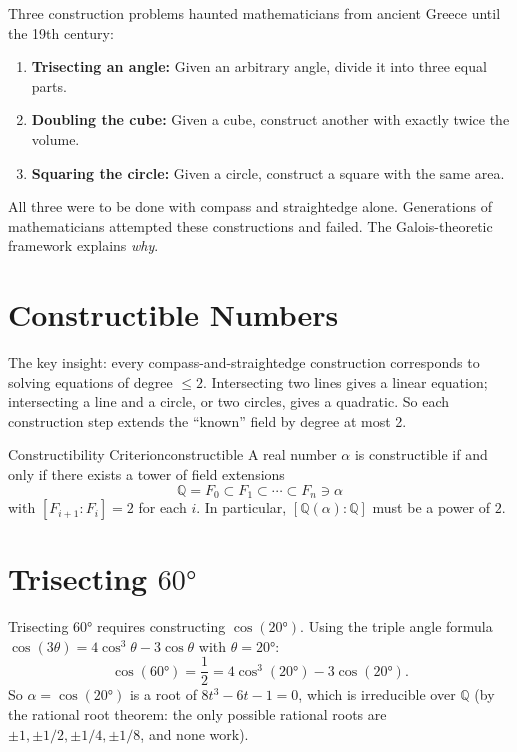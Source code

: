 \documentclass[11pt, a4paper, oneside]{book}
\newcommand{\Q}{\mathbb{Q}}
\begin{document}
\begin{historical}[title={2000 Years of Frustration}]
Three construction problems haunted mathematicians from ancient Greece until
the 19th century:
\begin{enumerate}[nosep]
\item \textbf{Trisecting an angle:} Given an arbitrary angle, divide it into
  three equal parts.
\item \textbf{Doubling the cube:} Given a cube, construct another with
  exactly twice the volume.
\item \textbf{Squaring the circle:} Given a circle, construct a square with
  the same area.
\end{enumerate}
All three were to be done with compass and straightedge alone. Generations of
mathematicians attempted these constructions and failed. The Galois-theoretic
framework explains \emph{why}.
\end{historical}

\section{Constructible Numbers}

The key insight: every compass-and-straightedge construction corresponds to
solving equations of degree $\leq 2$. Intersecting two lines gives a linear
equation; intersecting a line and a circle, or two circles, gives a quadratic.
So each construction step extends the ``known'' field by degree at most 2.

\begin{thm}{Constructibility Criterion}{constructible}
A real number $\alpha$ is constructible if and only if there exists a tower
of field extensions
\[
  \Q = F_0 \subset F_1 \subset \cdots \subset F_n \ni \alpha
\]
with $[F_{i+1} : F_i] = 2$ for each $i$. In particular, $[\Q(\alpha):\Q]$
must be a power of $2$.
\end{thm}

\section{Trisecting $60°$}

Trisecting $60°$ requires constructing $\cos(20°)$. Using the triple angle
formula $\cos(3\theta) = 4\cos^3\theta - 3\cos\theta$ with $\theta = 20°$:
\[
  \cos(60°) = \frac{1}{2} = 4\cos^3(20°) - 3\cos(20°).
\]
So $\alpha = \cos(20°)$ is a root of $8t^3 - 6t - 1 = 0$, which is
irreducible over $\Q$ (by the rational root theorem: the only possible
rational roots are $\pm 1, \pm 1/2, \pm 1/4, \pm 1/8$, and none work).
\end{document}
